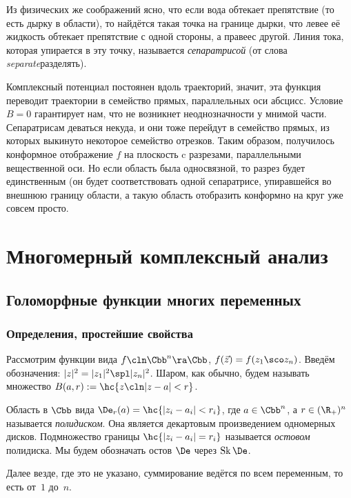 \documentclass[a4paper]{article}
\DeclareMathOperator{\Sk}{Sk}
\begin{document}
Из физических же соображений ясно, что если вода обтекает препятствие (то есть дырку
в области), то найдётся такая точка на границе дырки, что левее её жидкость обтекает препятствие
с одной стороны, а правее\т с другой. Линия тока, которая упирается в эту точку,
называется \emph{сепаратрисой} (от слова \emph{separate}\т разделять).

Комплексный потенциал постоянен вдоль траекторий, значит, эта функция переводит траектории
в семейство прямых, параллельных оси абсцисс. Условие $B=0$ гарантирует нам, что не возникнет
неоднозначности у мнимой части. Сепаратрисам деваться некуда, и они тоже перейдут в семейство
прямых, из которых выкинуто некоторое семейство отрезков. Таким образом, получилось конформное
отображение $f$ на плоскость c разрезами, параллельными вещественной оси. Но если область была
односвязной, то разрез будет единственным (он будет соответствовать одной сепаратрисе, упиравшейся во внешнюю
границу области, а такую область отобразить конформно на круг уже совсем просто.

\section{Многомерный комплексный анализ}

\subsection{Голоморфные функции многих переменных}

\subsubsection{Определения, простейшие свойства}

Рассмотрим функции вида $f\cln \Cbb^n\ra\Cbb$, $f(\vec z) = f(z_1\sco z_n)$.
Введём обозначения: $|z|^2 = |z_1|^2\spl|z_n|^2$. Шаром, как обычно, будем называть
множество $B(a,r) := \hc{z\cln |z-a|< r}$.

\begin{df}
Область в $\Cbb$ вида $\De_r(a)=\hc{|z_i-a_i| < r_i}$, где $a\in \Cbb^n$, а
$r\in (\R_+)^n$ называется \emph{полидиском}. Она является декартовым произведением
одномерных дисков. Подмножество границы $\hc{|z_i-a_i|=r_i}$
называется \emph{остовом} полидиска. Мы будем обозначать остов $\De$ через $\Sk \De$.
\end{df}


Далее везде, где это не указано, суммирование ведётся по всем переменным, то есть от~$1$ до~$n$.
\end{document}
